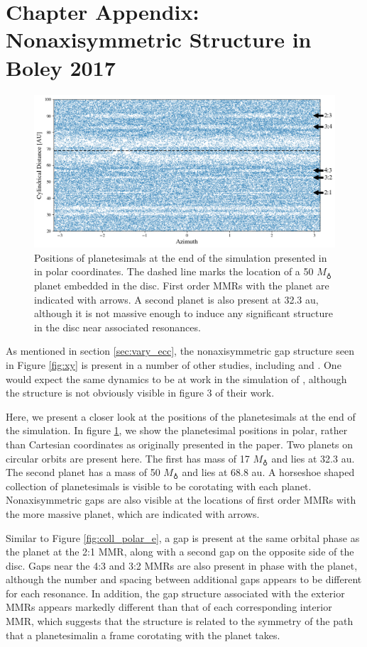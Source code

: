 \section{Chapter Appendix: Nonaxisymmetric Structure in Boley 2017}\label{sec:boley_plot}

\begin{figure}
    \includegraphics[width=\textwidth]{figures/grind/boley_rtheta.png}
    \caption{Positions of planetesimals at the end of the simulation presented in \cite{boley17} in polar coordinates. The dashed 
    line marks the location of a 50 $M_{\earth}$ planet embedded in the disc. First order MMRs with the planet are indicated with 
    arrows. A second planet is also present at 32.3 au, although it is not massive enough to induce any significant structure in the 
    disc near associated resonances.\label{fig:boley_rtheta}}
\end{figure}

As mentioned in section \ref{sec:vary_ecc}, the nonaxisymmetric gap structure seen in Figure \ref{fig:xy} is present in a number 
of other studies, including \cite{richardson00} and \cite{tabeshian16}. One would expect the same dynamics to be at work in the 
simulation of \cite{boley17}, although the structure is not obviously visible in figure 3 of their work.

Here, we present a closer look at the positions of the planetesimals at the end of the \cite{boley17} simulation. In figure 
\ref{fig:boley_rtheta}, we show the planetesimal positions in polar, rather than Cartesian coordinates as originally presented in 
the paper. Two planets on circular orbits are present here. The first has mass of 17 $M_{\earth}$ and lies at 32.3 au. The second 
planet has a mass of 50 $M_{\earth}$ and lies at 68.8 au. A horseshoe shaped collection of planetesimals is visible to be 
corotating with each planet. Nonaxisymmetric gaps are also visible at the locations of first order MMRs with the more massive 
planet, which are indicated with arrows.

Similar to Figure \ref{fig:coll_polar_e}, a gap is present at the same orbital phase as the planet at the 2:1 MMR, along with a 
second gap on the opposite side of the disc. Gaps near the 4:3 and 3:2 MMRs are also present in phase with the planet, 
although the number and spacing between additional gaps appears to be different for each resonance. In addition, the gap 
structure associated with the exterior MMRs appears markedly different than that of each corresponding interior MMR, which 
suggests that the structure is related to the symmetry of the path that a planetesimalin a frame corotating with the planet takes.